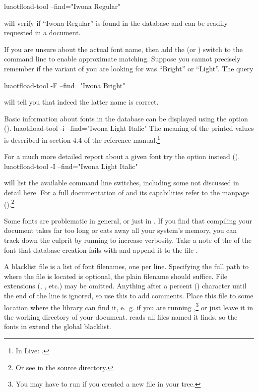 \beginlisting
  luaotfload-tool  --find="Iwona Regular"
\endlisting

\noindent
will verify if “Iwona Regular” is found in the database and can be
readily requested in a document.

If you are unsure about the actual font name, then add the
 (or ) switch to the command line to enable
approximate matching.
%
Suppose you cannot precisely remember if the variant of
 you are looking for was “Bright” or “Light”.
The query

\beginlisting
  luaotfload-tool  -F --find="Iwona Bright"
\endlisting

\noindent
will tell you that indeed the latter name is correct.

Basic information about fonts in the database can be displayed
using the  option ().
%
\beginlisting
  luaotfload-tool  -i --find="Iwona Light Italic"
\endlisting
%
\noindent
The meaning of the printed values is described in section 4.4 of the
\LUATEX reference manual.\footnote{%
  In \TEX Live: .
}

For a much more detailed report about a given font try the
 option instead ().
\beginlisting
  luaotfload-tool  -I --find="Iwona Light Italic"
\endlisting

 will list the available command line
switches, including some not discussed in detail here.
%
For a full documentation of  and its
capabilities refer to the manpage
().\footnote{%
  Or see  in the source directory.
}

\endsubsection

\label{font-blacklist}

Some fonts are problematic in general, or just in \LUATEX.
%
If you find that compiling your document takes far too long or eats
away all your system’s memory, you can track down the culprit by
running  to increase verbosity.
%
Take a note of the  of the font that database
creation fails with and append it to the file
.

A blacklist file is a list of font filenames, one per line.
Specifying the full path to where the file is located is optional, the
plain filename should suffice.
%
File extensions (, , etc.) may be omitted.
%
Anything after a percent (\inlinecode {\%}) character until the end of the line
is ignored, so use this to add comments.
%
Place this file to some location where the 
library can find it, e.~g.
 if you are running
,\footnote{%
  You may have to run  if you created a new file in
  your  tree.
}
or just leave it in the working directory of your document.
%
 reads all files named
 it finds, so the fonts in
 extend the global blacklist.

